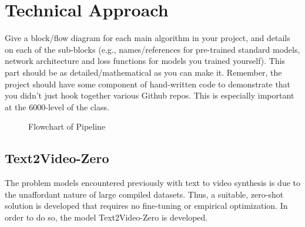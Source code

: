 \documentclass[conference]{IEEEtran}
\begin{document}
\section{Technical Approach}
\begin{tcolorbox}
Give a block/flow diagram for each main algorithm in your project, and details on
each of the sub-blocks (e.g., names/references for pre-trained standard models, network architecture and loss functions for models you trained yourself). This part should be as detailed/mathematical as you can make it. Remember, the project should have some component of hand-written code to demonstrate that you didn’t just hook together various Github repos. This is especially important at the 6000-level of the class.
\end{tcolorbox}
\begin{figure}
    \centering
    \caption{Flowchart of Pipeline}
    \label{fig:pipeline}
\end{figure}

\subsection{Text2Video-Zero}

The problem models encountered previously with text to video synthesis is due to the unaffordant nature of large compiled datasets. Thus, a suitable, zero-shot solution is developed that requires no fine-tuning or empirical optimization. In order to do so, the model Text2Video-Zero is developed.
\end{document}
